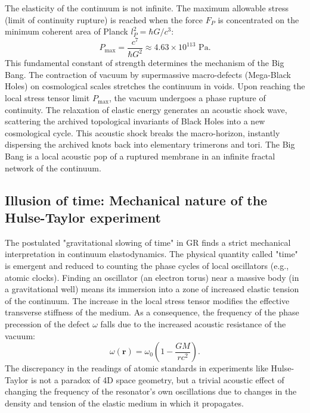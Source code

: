 \documentclass[11pt,a4paper]{article}
\begin{document}
The elasticity of the continuum is not infinite. The maximum allowable stress (limit of continuity rupture) is reached when the force $F_P$ is concentrated on the minimum coherent area of Planck $l_P^2 = \hbar G/c^3$:
\begin{equation}
	P_{\text{max}} = \frac{c^7}{\hbar G^2} \approx 4.63 \times 10^{113} \text{ Pa}.
\end{equation}
This fundamental constant of strength determines the mechanism of the Big Bang. The contraction of vacuum by supermassive macro-defects (Mega-Black Holes) on cosmological scales stretches the continuum in voids. Upon reaching the local stress tensor limit $P_{\text{max}}$, the vacuum undergoes a phase rupture of continuity. The relaxation of elastic energy generates an acoustic shock wave, scattering the archived topological invariants of Black Holes into a new cosmological cycle. This acoustic shock breaks the macro-horizon, instantly dispersing the archived knots back into elementary trimerons and tori. The Big Bang is a local acoustic pop of a ruptured membrane in an infinite fractal network of the continuum.

\subsection{Illusion of time: Mechanical nature of the Hulse-Taylor experiment}
The postulated "gravitational slowing of time" in GR finds a strict mechanical interpretation in continuum elastodynamics. The physical quantity called "time" is emergent and reduced to counting the phase cycles of local oscillators (e.g., atomic clocks).
Finding an oscillator (an electron torus) near a massive body (in a gravitational well) means its immersion into a zone of increased elastic tension of the continuum. The increase in the local stress tensor modifies the effective transverse stiffness of the medium.
As a consequence, the frequency of the phase precession of the defect $\omega$ falls due to the increased acoustic resistance of the vacuum:
\begin{equation}
	\omega(\mathbf{r}) = \omega_0 \left( 1 - \frac{GM}{rc^2} \right).
\end{equation}
The discrepancy in the readings of atomic standards in experiments like Hulse-Taylor is not a paradox of 4D space geometry, but a trivial acoustic effect of changing the frequency of the resonator's own oscillations due to changes in the density and tension of the elastic medium in which it propagates.
\end{document}
